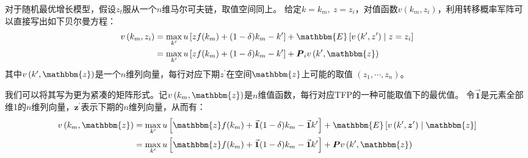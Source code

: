对于随机最优增长模型，假设$z_t$服从一个$n$维马尔可夫链，取值空间同上。
给定$k=k_m,~z=z_i$，对值函数$v\left(k_m,z_i\right)$，利用转移概率军阵可以直接写出如下贝尔曼方程：
\begin{equation*}
    \begin{aligned}
        v\left(k_m,z_i\right) &= \max_{k^{\prime}}u\left[zf(k_m)+(1-\delta)k_m-k^{\prime}\right] + 
            \mathbbm{E}\left[v\left(k^{\prime},z^{\prime}\right)\mid z=z_i\right] \\
        &= \max_{k^{\prime}}u\left[zf(k_m)+(1-\delta)k_m-k^{\prime}\right] +
            \boldsymbol{P}_i v\left(k^{\prime},\mathbbm{z}\right)
    \end{aligned}
\end{equation*}
其中$v\left(k^{\prime},\mathbbm{z}\right)$是一个$n$维列向量，每行对应下期$z^{\prime}$在空间$\mathbbm{z}$上可能的取值
$\left(z_1,\cdots,z_n\right)$。

我们可以将其写为更为紧凑的矩阵形式。记$v\left(k_m,\mathbbm{z}\right)$是$n$维值函数，每行对应TFP的一种可能取值下的最优值。
令$\vec{\boldsymbol{1}}$是元素全部维1的$n$维列向量，$\boldsymbol{z}^{\prime}$表示下期的$n$维列向量，从而有：
\begin{equation*}
    \begin{aligned}
        v\left(k_m,\mathbbm{z}\right) 
        &= \max_{k^{\prime}}u\left[\mathbbm{z}f(k_m)+\vec{\boldsymbol{1}}(1-\delta)k_m-\vec{\boldsymbol{1}}k^{\prime}\right] + 
            \mathbbm{E}\left[v\left(k^{\prime},\boldsymbol{z}^{\prime}\right)\mid \mathbbm{z}\right] \\
        &= \max_{k^{\prime}}u\left[\mathbbm{z}f(k_m)+\vec{\boldsymbol{1}}(1-\delta)k_m-\vec{\boldsymbol{1}}k^{\prime}\right] +
            \boldsymbol{P} v\left(k^{\prime},\mathbbm{z}\right)
    \end{aligned}
\end{equation*}